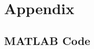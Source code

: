\renewcommand{\thesubsection}{\thesection.\arabic{subsection}}
\appendix
\section{Appendix}
\subsection{MATLAB Code}
\label{code:snr}

\begin{center}

\end{center}


